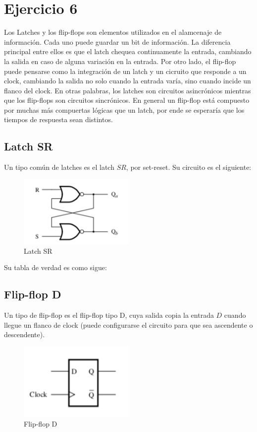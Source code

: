 \section{Ejercicio 6}


Los Latches y los flip-flops son elementos utilizados en el alamcenaje de información. Cada uno puede guardar un bit de información. La diferencia principal entre ellos es que el latch chequea continuamente la entrada, cambiando la salida en caso de alguna variaci\'on en la entrada. Por otro lado, el flip-flop puede pensarse como la integración de un latch y un cicruito que responde a un clock, cambiando la salida no solo cuando la entrada varía, sino cuando incide un flanco del clock. En otras palabras, los latches son circuitos asincrónicos mientras que los flip-flops son circuitos sincrónicos. En general un flip-flop está compuesto por muchas más compuertas lógicas que un latch, por ende se esperaría que los tiempos de respuesta sean distintos. 



\subsection{Latch SR}

Un tipo común de latches es el latch $SR$, por set-reset. Su circuito es el siguiente:

\begin{figure}[H]
	\centering
	\includegraphics[width=0.5\textwidth]{Ejercicio6/Recursos/latchSR}
	\caption{Latch SR}
\end{figure}

Su tabla de verdad es como sigue:


\subsection{Flip-flop D}
Un tipo de flip-flop es el flip-flop tipo D, cuya salida copia la entrada $D$ cuando llegue un flanco de clock (puede configurarse el circuito para que sea ascendente o descendente). 

\begin{figure}[H]
	\centering
	\includegraphics[width=0.5\textwidth]{Ejercicio6/Recursos/flipflopD}
	\caption{Flip-flop D}
\end{figure}

